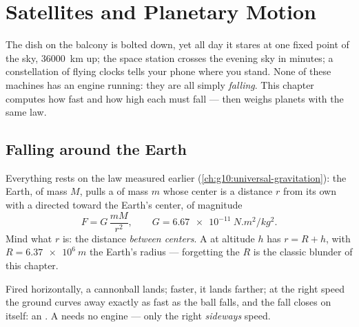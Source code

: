 \chapter{Satellites and Planetary Motion}\label{ch:g12:satellites-kepler}

The dish on the balcony is bolted down, yet all day it stares at one
fixed point of the sky, \qty{36000}{km} up; the space station
crosses the evening sky in minutes; a constellation of flying clocks
tells your phone where you stand. None of these machines has an
engine running: they are all simply \emph{falling}. This chapter
computes how fast and how high each must fall --- then weighs
planets with the same law.

\section{Falling around the Earth}

Everything rests on the law measured earlier
(\cref{ch:g10:universal-gravitation}): the Earth, of mass $M$, pulls
a  of mass $m$ whose center is a distance $r$ from its own
with a  directed toward the Earth's center, of magnitude
\[ F = G\,\frac{m M}{r^2}, \qquad G = \qty{6.67e-11}{N.m^2/kg^2}. \]
Mind what $r$ is: the distance \emph{between centers}. A  at
altitude $h$ has $r = R + h$, with $R = \qty{6.37e6}{m}$ the Earth's
radius --- forgetting the $R$ is the classic blunder of this chapter.

\begin{remark}\label{rem:g12:satellites-kepler:cannon}
Fired horizontally, a cannonball lands; faster, it lands farther;
at the right speed the ground curves away exactly as fast as the
ball falls, and the fall closes on itself: an . A 
needs no engine --- only the right \emph{sideways} speed.
\end{remark}

